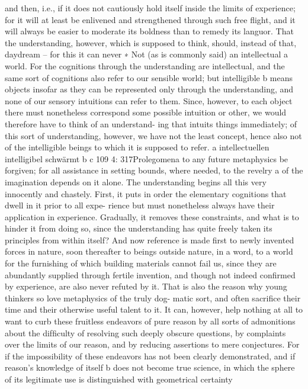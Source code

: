 and then, i.e., if it does not cautiously hold itself inside the limits of
experience; for it will at least be enlivened and strengthened through
such free ﬂight, and it will always be easier to moderate its boldness
than to remedy its languor. That the understanding, however, which is
supposed to think, should, instead of that, daydream – for this it can never
∗ Not (as is commonly said) an intellectual a world. For the cognitions through the
understanding are intellectual, and the same sort of cognitions also refer to our
sensible world; but intelligible b means objects insofar as they can be represented
only through the understanding, and none of our sensory intuitions can refer to
them. Since, however, to each object there must nonetheless correspond some
possible intuition or other, we would therefore have to think of an understand-
ing that intuits things immediately; of this sort of understanding, however, we
have not the least concept, hence also not of the intelligible beings to which it is
supposed to refer.
a intellectuellen
intelligibel
schwärmt
b
c
109
4: 317Prolegomena to any future metaphysics
be forgiven; for all assistance in setting bounds, where needed, to the
revelry a of the imagination depends on it alone.
The understanding begins all this very innocently and chastely. First,
it puts in order the elementary cognitions that dwell in it prior to all expe-
rience but must nonetheless always have their application in experience.
Gradually, it removes these constraints, and what is to hinder it from
doing so, since the understanding has quite freely taken its principles
from within itself? And now reference is made ﬁrst to newly invented
forces in nature, soon thereafter to beings outside nature, in a word, to a
world for the furnishing of which building materials cannot fail us, since
they are abundantly supplied through fertile invention, and though not
indeed conﬁrmed by experience, are also never refuted by it. That is
also the reason why young thinkers so love metaphysics of the truly dog-
matic sort, and often sacriﬁce their time and their otherwise useful talent
to it.
It can, however, help nothing at all to want to curb these fruitless
endeavors of pure reason by all sorts of admonitions about the difﬁculty
of resolving such deeply obscure questions, by complaints over the limits
of our reason, and by reducing assertions to mere conjectures. For if the
impossibility of these endeavors has not been clearly demonstrated, and if
reason’s knowledge of itself b does not become true science, in which the
sphere of its legitimate use is distinguished with geometrical certainty
